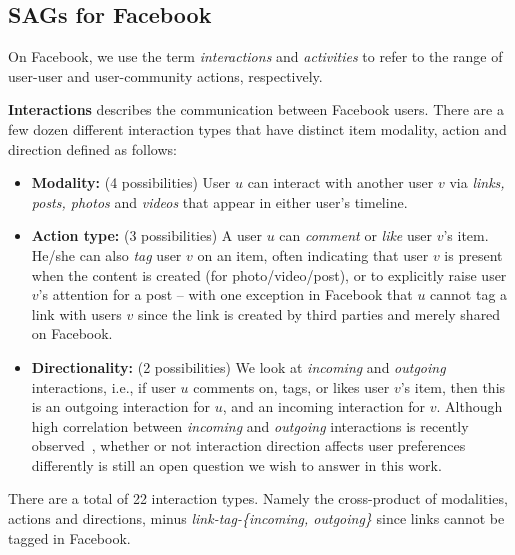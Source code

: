 \subsection{SAGs for Facebook}

On Facebook, we use the term {\em interactions} and {\em activities}
to refer to the range of user-user and user-community actions,
respectively.

{\bf Interactions} describes the communication between Facebook users. There are a few dozen different interaction types that have distinct item modality, action and direction defined
as follows:
\begin{itemize}
\item \textbf{Modality:} (4 possibilities)
User $u$ can interact with another user $v$ via \textit{links, posts, photos} and \textit{videos} that appear in either user's timeline.

\item \textbf{Action type:} (3 possibilities)
A user $u$ can \textit{comment} or \textit{like} 
user $v$'s item. He/she can also \textit{tag} user $v$ on an 
item, often indicating that user $v$ is present when the content is created (for photo/video/post), 
or to explicitly raise user $v$'s attention for a post -- with one exception in Facebook that $u$ cannot tag a link with users $v$ since the link is created by third parties and merely shared on Facebook.

\item \textbf{Directionality:} (2 possibilities)
We look at \textit{incoming} and \textit{outgoing} interactions, i.e.,
if user $u$ comments on, tags, or likes user $v$'s item,
then this is an outgoing interaction for $u$, and an incoming interaction for $v$.
Although high correlation between \textit{incoming} and \textit{outgoing} interactions 
is recently observed~\cite{saez2011high}, whether or not interaction direction 
affects user preferences differently is still an open question we wish to answer
in this work. 
      								
\end{itemize}

There are a total of 22 interaction types. Namely the cross-product of modalities, actions and directions, minus {\em link-tag-\{incoming, outgoing\}} since links cannot be tagged in Facebook.



